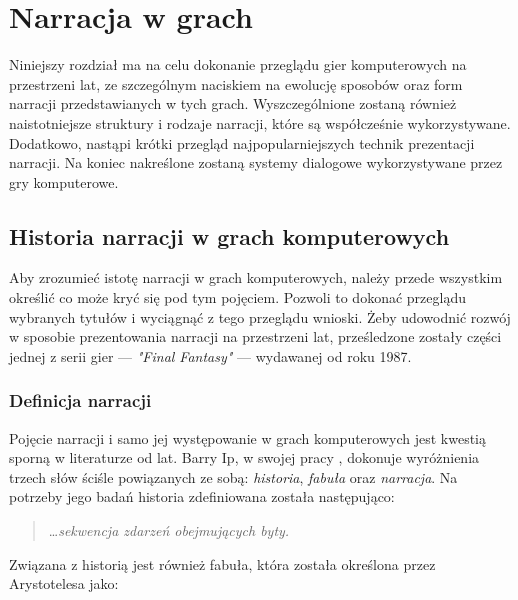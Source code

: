 \graphicspath{{chapters/chapter1/imgs/}}

\chapter{Narracja w grach}\label{chapter:ch1}

Niniejszy rozdział ma na celu dokonanie przeglądu gier komputerowych na przestrzeni lat, ze
szczególnym naciskiem na ewolucję sposobów oraz form narracji przedstawianych w tych grach.
Wyszczególnione zostaną również naistotniejsze struktury i rodzaje narracji, które są współcześnie
wykorzystywane. Dodatkowo, nastąpi krótki przegląd najpopularniejszych technik prezentacji narracji.
Na koniec nakreślone zostaną systemy dialogowe wykorzystywane przez gry komputerowe.

\section{Historia narracji w grach komputerowych}\label{section:ch1_1}

Aby zrozumieć istotę narracji w grach komputerowych, należy przede wszystkim określić
co może kryć się pod tym pojęciem. Pozwoli to dokonać przeglądu wybranych tytułów
i wyciągnąć z tego przeglądu wnioski. Żeby udowodnić rozwój w sposobie prezentowania narracji
na przestrzeni lat, prześledzone zostały części jednej z serii gier --- \textit{"Final Fantasy"} ---
wydawanej od roku 1987.

\subsection{Definicja narracji}\label{subsection:ch1_1_1}

Pojęcie narracji i samo jej występowanie w grach komputerowych jest kwestią sporną
w literaturze od lat. Barry Ip, w swojej pracy \cite{narrative_structures}, dokonuje wyróżnienia trzech słów ściśle
powiązanych ze sobą: \textit{historia}, \textit{fabuła} oraz \textit{narracja}. Na potrzeby jego
badań historia zdefiniowana została następująco:

\begin{quotation}
	\ldots \textit{sekwencja zdarzeń obejmujących byty.} \cite{narrative_structures}
\end{quotation}

Związana z historią jest również fabuła, która została określona przez Arystotelesa jako:

